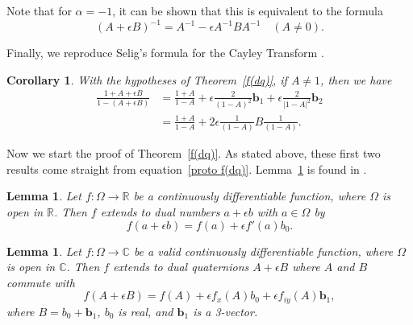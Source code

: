 \documentclass[12pt,reqno]{amsart}
\newtheorem{lemma}[theorem]{Lemma}
\newtheorem{cor}[theorem]{Corollary}
\begin{document}
Note that for $\alpha = -1$, it can be shown that this is equivalent to the formula
\begin{equation}
(A + \epsilon B)^{-1} = A^{-1} - \epsilon A^{-1} B A^{-1} \quad (A \ne 0).
\end{equation}

Finally, we reproduce Selig's formula for the Cayley Transform \cite{selig}.

\begin{cor}
With the hypotheses of Theorem~\ref{f(dq)}, if $A \ne 1$, then we have
\begin{equation}
\begin{aligned}
\frac{1 + A + \epsilon B}{1 - (A + \epsilon B)}
&=
\frac{1+A}{1-A} + \epsilon \frac{2}{(1-A)^2} \bm b_1 + \epsilon \frac{2}{|1-A|^2} \bm b_2 \\
&=
\frac{1+A}{1-A} + 2 \epsilon \frac{1}{(1-A)} B \frac{1}{(1-A)} .
\end{aligned}
\end{equation}
\end{cor}

Now we start the proof of Theorem~\ref{f(dq)}.  As stated above, these first two results come straight from equation~\eqref{proto f(dq)}.  Lemma~\ref{f(d)} is found in \cite{wiki-1}.

\begin{lemma}
\label{f(d)}
Let $f:\Omega \to \mathbb R$ be a continuously differentiable function, where $\Omega$ is open in $\mathbb R$.  Then $f$ extends to dual numbers $a + \epsilon b$ with $a \in \Omega$ by
\begin{equation}
\label{dual number case}
f(a + \epsilon b ) = f(a) + \epsilon f'(a) b_0 .
\end{equation}
\end{lemma}

\begin{lemma}
\label{f(dq) commute}
Let $f:\Omega \to \mathbb C$ be a valid continuously differentiable function, where $\Omega$ is open in $\mathbb C$.  Then $f$ extends to dual quaternions $A + \epsilon B$ where $A$ and $B$ commute with
\begin{equation}
\label{commuting case}
f(A + \epsilon B ) = f(A) + \epsilon f_x(A) b_0
+ \epsilon f_{iy}(A) \bm b_1 ,
\end{equation}
where $B = b_0 + \bm b_1$, $b_0$ is real, and $\bm b_1$ is a 3-vector.
\end{lemma}
\end{document}
